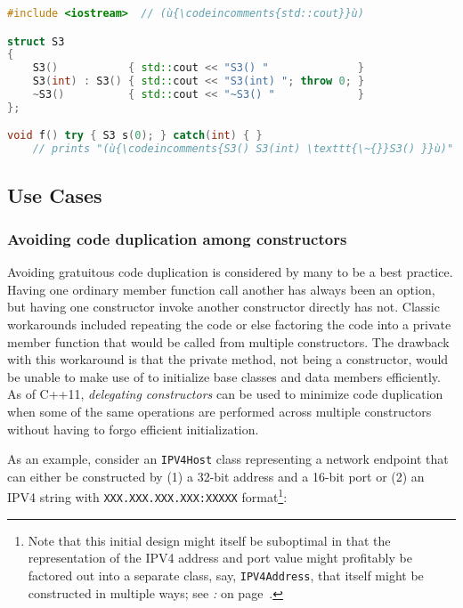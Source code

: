 \begin{lstlisting}[language=C++]
#include <iostream>  // (ù{\codeincomments{std::cout}}ù)

struct S3
{
    S3()           { std::cout << "S3() "              }
    S3(int) : S3() { std::cout << "S3(int) "; throw 0; }
    ~S3()          { std::cout << "~S3() "             }
};

void f() try { S3 s(0); } catch(int) { }
    // prints "(ù{\codeincomments{S3() S3(int) \texttt{\~{}}S3() }}ù)" to (ù{\codeincomments{stdout}}ù)
\end{lstlisting}


\subsection[Use Cases]{Use Cases}\label{ctordelegating-use-cases}

\subsubsection[Avoiding code duplication among constructors]{Avoiding code duplication among constructors}\label{avoiding-code-duplication-among-constructors}

Avoiding gratuitous code duplication is considered by many to be a best
practice. Having one ordinary member function call another has always
been an option, but having one constructor invoke another constructor
directly has not. Classic workarounds included repeating the code or
else factoring the code into a private member function that would be
called from multiple constructors. The drawback with this workaround is
that the private method, not being a constructor, would be unable to
make use of  to initialize base classes and data members efficiently. As of C++11, \emph{delegating
constructors} can be used to minimize code duplication when some of
the same operations are performed across multiple constructors without
having to forgo efficient initialization.

As an example, consider an \lstinline!IPV4Host! class representing a
network endpoint that can either be constructed by (1) a 32-bit address
and a 16-bit port or (2) an IPV4 string with
\lstinline!XXX.XXX.XXX.XXX:XXXXX! format{\cprotect\footnote{Note that
this initial design might itself be suboptimal in that the
representation of the IPV4 address and port value might profitably be
factored out into a separate  class, say,
\lstinline!IPV4Address!, that itself might be constructed in multiple ways;
  see {\it{}:} {\it{}} on page~\pageref{suboptimal-factoring}.}}:


